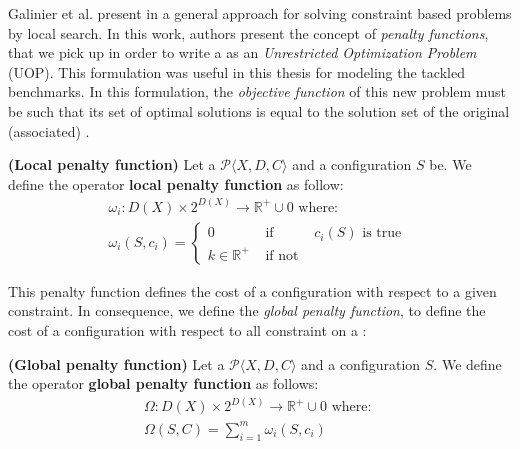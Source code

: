 Galinier et al. present in \cite{Galinier04} a general approach for solving constraint based problems by local search. In this work, authors present the concept of {\it penalty functions}, that we pick up in order to write a \csp{} as an \textit{Unrestricted Optimization Problem} (UOP). This formulation was useful in this thesis for modeling the tackled benchmarks. In this formulation, the \textit{objective function} of this new problem must be such that its set of optimal solutions is equal to the solution set of the original (associated) \csp.

\begin{definition}{\bf (Local penalty function)}
\label{def:local_cost}
Let a {\bf \csp} $\mathcal{P}\langle X,D,C \rangle$ and a configuration $S$ be. We define the operator {\bf local penalty function} as follow: 
\begin{equation*}
\begin{array}{l}
	\omega_i:D\left(X\right)\times 2^{D\left(X\right)}\rightarrow\mathbb{R}^+\cup 0\text{ where: }\\
	\omega_i\left(S,c_i\right)=\left\{
	\begin{array}{lll}
	0 & \text{ if } & c_i(S)\text{ is true }\\
	k \in \mathbb{R}^+ & \text{ if not } &
	\end{array}
	\right.
\end{array}
\end{equation*}
\end{definition}

This penalty function defines the cost of a configuration with respect to a given constraint. In consequence, we define the \textit{global penalty function}, to define the cost of a configuration with respect to all constraint on a \csp:

\begin{definition}{\bf (Global penalty function)}
\label{def:global_cost}
Let a {\bf \csp} $\mathcal{P}\langle X,D,C \rangle$ and a configuration $S$. We define the operator {\bf global penalty function} as follows: 
\begin{equation*}
\begin{array}{l}
\Omega:D\left(X\right)\times 2^{D\left(X\right)}\rightarrow\mathbb{R}^+ \cup 0\text{ where: }\\
\Omega\left(S,C\right)=\displaystyle\sum_{i=1}^{m}{\omega_i\left(S,c_i\right)}
\end{array}
\end{equation*}
\end{definition}

